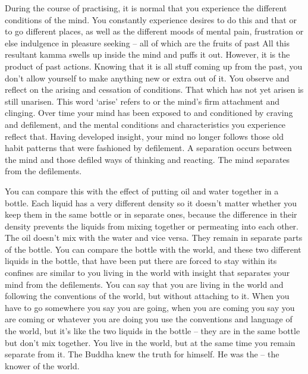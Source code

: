 During the course of practising, it is normal that you experience the different conditions of the mind. You constantly experience desires to do this and that or to go different places, as well as the different moods of mental pain, frustration or else indulgence in pleasure seeking -- all of which are the fruits of past  All this resultant kamma swells up inside the mind and puffs it out. However, it is the product of past actions. Knowing that it is all stuff coming up from the past, you don't allow yourself to make anything new or extra out of it. You observe and reflect on the arising and cessation of conditions. That which has not yet arisen is still unarisen. This word `arise' refers to  or the mind's firm attachment and clinging. Over time your mind has been exposed to and conditioned by craving and defilement, and the mental conditions and characteristics you experience reflect that. Having developed insight, your mind no longer follows those old habit patterns that were fashioned by defilement. A separation occurs between the mind and those defiled ways of thinking and reacting. The mind separates from the defilements. 

You can compare this with the effect of putting oil and water together in a bottle. Each liquid has a very different density so it doesn't matter whether you keep them in the same bottle or in separate ones, because the difference in their density prevents the liquids from mixing together or permeating into each other. The oil doesn't mix with the water and vice versa. They remain in separate parts of the bottle. You can compare the bottle with the world, and these two different liquids in the bottle, that have been put there are forced to stay within its confines are similar to you living in the world with insight that separates your mind from the defilements. You can say that you are living in the world and following the conventions of the world, but without attaching to it. When you have to go somewhere you say you are going, when you are coming you say you are coming or whatever you are doing you use the conventions and language of the world, but it's like the two liquids in the bottle -- they are in the same bottle but don't mix together. You live in the world, but at the same time you remain separate from it. The Buddha knew the truth for himself. He was the  -- the knower of the world. 

